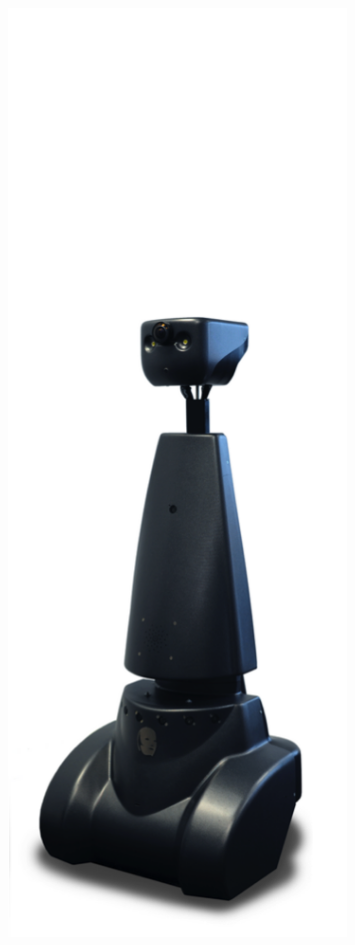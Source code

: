 \begin{figure}[ht]
\begin{minipage}[t]{.25\linewidth}
      \label{fig:x} 
   \end{minipage}%
   \hfill
   \begin{minipage}[t]{.25\linewidth} 
      \centering 
      \includegraphics[width=0.8\textwidth]{bilder/grundlagen/3.png}

\end{minipage}
\end{figure}
